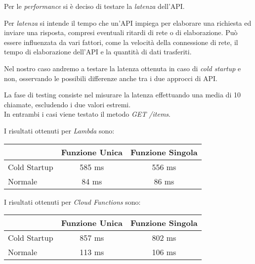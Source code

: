 Per le \textit{performance} si è deciso di testare la \textit{latenza} dell'API.

Per \textit{latenza} si intende il tempo che un'API impiega per elaborare una richiesta ed inviare una risposta, compresi eventuali ritardi di rete o di elaborazione. Può essere influenzata da vari fattori, come la velocità della connessione di rete, il tempo di elaborazione dell'API e la quantità di dati trasferiti.

Nel nostro caso andremo a testare la latenza ottenuta in caso di \textit{cold startup} e non, osservando le possibili differenze anche tra i due approcci di API.

La fase di testing consiste nel misurare la latenza effettuando una media di 10 chiamate, escludendo i due valori estremi.\\
In entrambi i casi viene testato il metodo \textit{GET /items}.

I risultati ottenuti per \textit{Lambda} sono:
\begin{table}[htbp]
\centering
\begin{tabular}{lcc}
\toprule
 & \textbf{Funzione Unica} & \textbf{Funzione Singola} \\
\midrule
Cold Startup & 585 ms & 556 ms \\ 
Normale & 84 ms & 86 ms \\
\bottomrule
\end{tabular}
\end{table}

I risultati ottenuti per \textit{Cloud Functions} sono:
\begin{table}[htbp]
\centering
\begin{tabular}{lcc}
\toprule
 & \textbf{Funzione Unica} & \textbf{Funzione Singola} \\
\midrule
Cold Startup & 857 ms & 802 ms \\
Normale & 113 ms & 106 ms \\
\bottomrule
\end{tabular}
\end{table}
